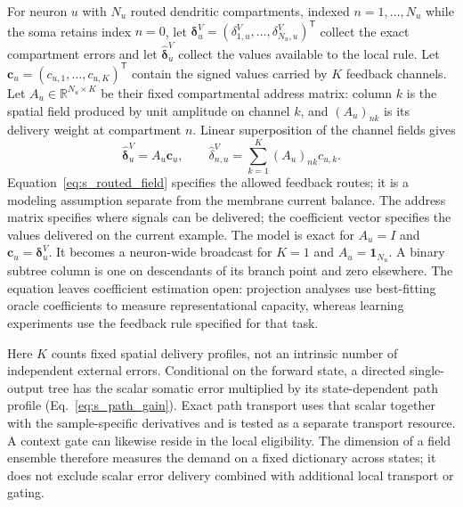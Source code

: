 For neuron $u$ with $N_u$ routed dendritic compartments, indexed
$n=1,\ldots,N_u$ while the soma retains index $n=0$, let
$\bm\delta^V_u=(\delta^V_{1,u},\ldots,\delta^V_{N_u,u})^{\mathsf T}$ collect
the exact compartment errors and let $\widehat{\bm\delta}^V_u$ collect the
values available to the local rule. Let
$\bm c_u=(c_{u,1},\ldots,c_{u,K})^{\mathsf T}$ contain the signed values
carried by $K$ feedback channels. Let
$A_u\in\mathbb R^{N_u\times K}$ be their fixed compartmental address matrix:
column $k$ is the spatial field produced by unit amplitude on channel $k$, and
$(A_u)_{nk}$ is its delivery weight at compartment $n$. Linear superposition of
the channel fields gives
\begin{equation}
\widehat{\bm\delta}^{V}_u=A_u\bm c_u,
\qquad
\widehat\delta^V_{n,u}=\sum_{k=1}^{K}(A_u)_{nk}c_{u,k}.
\label{eq:s_routed_field}
\end{equation}
Equation~\ref{eq:s_routed_field} specifies the allowed feedback routes;
it is a modeling assumption separate from the membrane current balance. The address matrix specifies where signals can
be delivered; the coefficient vector specifies the values delivered on the
current example. The model is exact for $A_u=I$ and
$\bm c_u=\bm\delta^V_u$. It becomes a neuron-wide broadcast for
$K=1$ and $A_u=\bm 1_{N_u}$. A binary subtree column is one on descendants of
its branch point and zero elsewhere. The equation leaves coefficient
estimation open: projection analyses use best-fitting oracle coefficients to
measure representational capacity, whereas learning experiments use the
feedback rule specified for that task.

Here $K$ counts fixed spatial delivery profiles, not an intrinsic number of
independent external errors. Conditional on the forward state, a directed
single-output tree has the scalar somatic error multiplied by its
state-dependent path profile (Eq.~\ref{eq:s_path_gain}). Exact path transport
uses that scalar together with the sample-specific derivatives and is tested
as a separate transport resource. A context gate can likewise reside in the
local eligibility. The dimension of a field ensemble therefore measures the
demand on a fixed dictionary across states; it does not exclude scalar error
delivery combined with additional local transport or gating.

